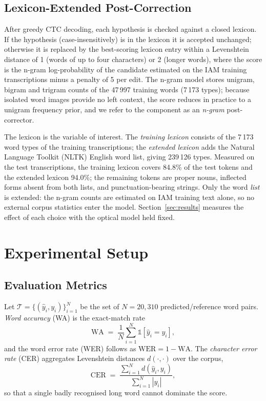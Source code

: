 \documentclass[conference]{IEEEtran}
\newcommand{\nsamples}{20{,}310}
\begin{document}
\subsection{Lexicon-Extended Post-Correction}
\label{sec:trigram}
After greedy CTC decoding, each hypothesis is checked against a closed
lexicon. If the hypothesis (case-insensitively) is in the lexicon it is
accepted unchanged; otherwise it is replaced by the best-scoring
lexicon entry within a Levenshtein distance of 1 (words of up to four
characters) or 2 (longer words), where the score is the n-gram
log-probability of the candidate estimated on the IAM training
transcriptions minus a penalty of 5 per edit. The n-gram model stores
unigram, bigram and trigram counts of the 47\,997 training words (7\,173
types); because isolated word images provide no left context, the
score reduces in practice to a unigram frequency prior, and we refer to
the component as an \emph{n-gram} post-corrector.

The lexicon is the variable of interest. The \emph{training lexicon}
consists of the 7\,173 word types of the training transcriptions; the
\emph{extended lexicon} adds the Natural Language Toolkit (NLTK)
English word list, giving 239\,126 types. Measured on the test
transcriptions, the training lexicon covers 84.8\% of the test tokens
and the extended lexicon 94.0\%; the remaining tokens are proper
nouns, inflected forms absent from both lists, and punctuation-bearing
strings. Only the word \emph{list} is extended: the n-gram counts are
estimated on IAM training text alone, so no external corpus statistics
enter the model. Section~\ref{sec:results} measures the effect of each
choice with the optical model held fixed.

\section{Experimental Setup}
\label{sec:experiments}

\subsection{Evaluation Metrics}
Let $\mathcal{T}=\{(\hat{y}_i, y_i)\}_{i=1}^{N}$ be the set of
$N=\nsamples$ predicted/reference word pairs. \emph{Word accuracy}
(WA) is the exact-match rate
\begin{equation}
\mathrm{WA} \;=\; \frac{1}{N}\sum_{i=1}^{N}
      \mathbb{1}\!\left[\hat{y}_i = y_i\right],
\label{eq:wa}
\end{equation}
and the word error rate (WER) follows as
$\mathrm{WER}=1-\mathrm{WA}$. The \emph{character error rate} (CER)
aggregates Levenshtein distances $d(\cdot,\cdot)$ over the corpus,
\begin{equation}
\mathrm{CER} \;=\;
  \frac{\sum_{i=1}^{N} d(\hat{y}_i, y_i)}
       {\sum_{i=1}^{N} |y_i|},
\label{eq:cer}
\end{equation}
so that a single badly recognised long word cannot dominate the score.
\end{document}
